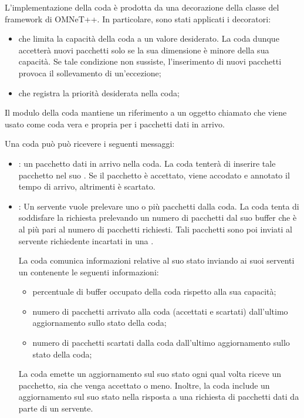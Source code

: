 \documentclass[conference]{IEEEtran}
\begin{document}
L'implementazione della coda è prodotta da una decorazione della classe 
del framework di OMNeT++. In particolare, sono stati applicati i decoratori:
\begin{itemize}
    \item {} che limita la capacità della coda a un valore desiderato.
    La coda dunque accetterà nuovi pacchetti solo se la sua dimensione è minore della
    sua capacità. Se tale condizione non sussiste, l'inserimento di nuovi pacchetti
    provoca il sollevamento di un'eccezione;
    \item {} che registra la priorità desiderata nella coda;
\end{itemize}
Il modulo della coda mantiene un riferimento a un oggetto  chiamato
 che viene usato
come coda vera e propria per i pacchetti dati in arrivo.

Una coda può può ricevere i seguenti messaggi:
\begin{itemize}
    \item {}: un pacchetto dati in arrivo nella coda. La coda tenterà di
    inserire tale pacchetto nel suo . Se il pacchetto è accettato,
    viene accodato e annotato il tempo di arrivo, altrimenti è scartato.
    \item {}: Un servente vuole prelevare uno o più pacchetti
     dalla coda. La coda tenta di soddisfare la richiesta prelevando un numero di
     pacchetti dal suo buffer che è al più pari al numero di pacchetti richiesti.
     Tali pacchetti sono poi inviati al servente richiedente incartati in una
     .

La coda comunica informazioni relative al suo stato inviando ai suoi serventi un
 contenente le seguenti informazioni:
\begin{itemize}
    \item percentuale di buffer occupato della coda rispetto alla sua capacità;
    \item numero di pacchetti arrivato alla coda (accettati e scartati) dall'ultimo
    aggiornamento sullo stato della coda;
    \item numero di pacchetti scartati dalla coda dall'ultimo aggiornamento sullo stato
    della coda;
\end{itemize}
La coda emette un aggiornamento sul suo stato ogni qual volta riceve un pacchetto, sia
che venga accettato o meno. Inoltre, la coda include un aggiornamento sul suo stato
nella risposta a una richiesta di pacchetti dati da parte di un servente.    
\end{itemize}
\end{document}
